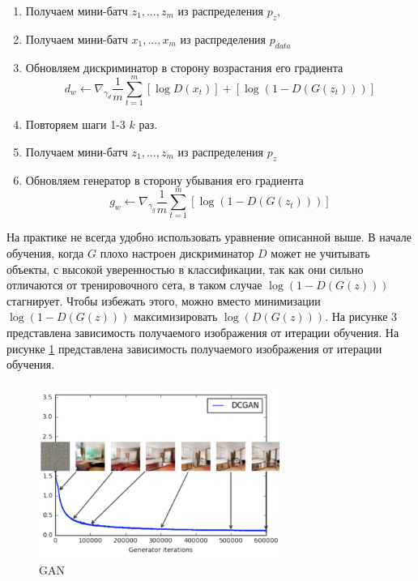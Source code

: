 \documentclass{article}
\theoremstyle{definition}
\theoremstyle{theorem}
\theoremstyle{remark}
\theoremstyle{theorem}
\theoremstyle{example}
\theoremstyle{theorem}
\theoremstyle{theorem}
\theoremstyle{theorem}
\theoremstyle{theorem}
\begin{document}
\begin{enumerate}
	\item Получаем мини-батч ${z_1,...,z_m}$ из распределения $p_z$,
	\item Получаем мини-батч ${x_1,...,x_m}$ из распределения $p_{data}$
	\item Обновляем дискриминатор в сторону возрастания его градиента $$ d_w \leftarrow \nabla_{\gamma_d} \frac{1}{m} \sum\limits_{t=1}^{m}\left[\log D(x_t)\right] +  \left[\log\left(1-D\left(G(z_t)\right)\right)\right]$$
	\item Повторяем шаги 1-3 $k$ раз.
	\item Получаем мини-батч ${z_1,...,z_m}$ из распределения $p_z$
	\item Обновляем генератор в сторону убывания его градиента $$ g_w \leftarrow \nabla_{\gamma_g} \frac{1}{m} \sum\limits_{t=1}^{m} \left[\log\left(1-D\left(G(z_t)\right)\right)\right] $$ 
\end{enumerate}

На практике не всегда удобно использовать уравнение описанной выше. В начале обучения, когда $G$ плохо настроен дискриминатор $D$ может не учитывать объекты, с высокой уверенностью в классификации, так как они сильно отличаются от тренировочного сета, в таком случае $\log\left(1-D\left(G(z)\right)\right)$ стагнирует. Чтобы избежать этого, можно вместо минимизации $\log\left(1-D\left(G(z)\right)\right)$ максимизировать $\log\left(D\left(G(z)\right)\right)$. На рисунке 3 представлена зависимость получаемого изображения от итерации обучения. На рисунке \ref{fig:training} представлена зависимость получаемого изображения от итерации обучения.

\begin{figure}[!ht]
	\centering
	\includegraphics[width=0.7\textwidth]{img/training.png}
	\caption {GAN}
	\label{fig:training}
\end{figure}
\end{document}
